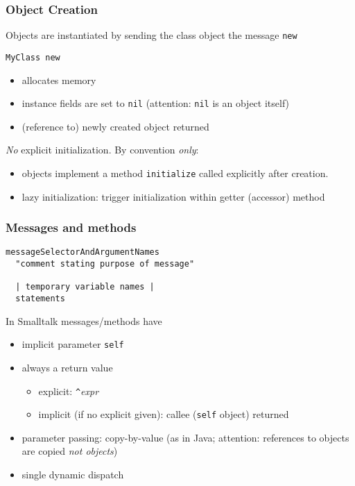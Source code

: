 \documentclass[handout]{beamer}
\begin{document}
\begin{frame}[fragile]
  \frametitle{Object Creation}

  Objects are instantiated by sending the class object the message \texttt{new}

\begin{lstlisting}[language=Smalltalk]
   MyClass new
\end{lstlisting}

\begin{itemize}
  \item allocates memory
  \item instance fields are set to \texttt{nil} (attention:
    \texttt{nil} is an object itself)
  \item (reference to) newly created object returned
\end{itemize}

\pause\bigskip

\emph{No} explicit initialization. By convention \emph{only}:
\begin{itemize}
  \item objects implement a method \texttt{initialize} called
    explicitly after creation.
  \item lazy initialization: trigger initialization within
    getter (accessor) method
\end{itemize}

\end{frame}


\begin{frame}[fragile]
\frametitle{Messages and methods}

\begin{lstlisting}[language=Smalltalk]
messageSelectorAndArgumentNames
  "comment stating purpose of message"

  | temporary variable names |
  statements
\end{lstlisting}

In Smalltalk messages/methods have
\begin{itemize}
  \item implicit parameter \texttt{self}
  \item always a return value
    \begin{itemize}
      \item explicit: \texttt{\^}\textit{expr}
      \item implicit (if no explicit given): callee (\texttt{self} object) returned
   \end{itemize}
 \item parameter passing: copy-by-value (as in Java; attention:
   references to objects are copied \emph{not objects})
 \item single dynamic dispatch
\end{itemize}

\end{frame}
\end{document}
